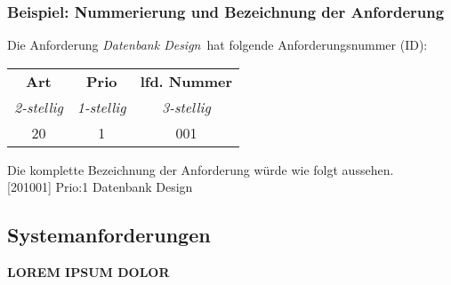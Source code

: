 \subsubsection{Beispiel: Nummerierung und Bezeichnung der Anforderung}

Die Anforderung  \glqq\emph{Datenbank Design}\grqq \ hat folgende Anforderungsnummer (ID):

\begin{table} [htbp]
	\centering
	\begin{tabular}{c|c|c}
		\textbf{Art} & \textbf{Prio} & \textbf{lfd. Nummer} \\
		\emph{2-stellig} & \emph{1-stellig} & \emph{3-stellig} \\ \hline
		20 & 1 & 001 \\
	\end{tabular}
\end{table}

Die komplette Bezeichnung der Anforderung würde wie folgt aussehen. \\

[201001] Prio:1 Datenbank Design

\subsection{Systemanforderungen}

{\color{red}\textbf{LOREM IPSUM DOLOR}}